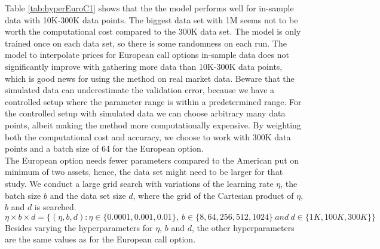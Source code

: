 Table \ref{tab:hyperEuroC1} shows that the the model performs well for in-sample data with 10K-300K data points. The biggest data set with 1M seems not to be worth the computational cost compared to the 300K data set. The model is only trained once on each data set, so there is some randomness on each run. The model to interpolate prices for European call options in-sample data does not significantly improve with gathering more data than 10K-300K data points, which is good news for using the method on real market data.  Beware that the simulated data can underestimate the validation error, because we have a controlled setup where the parameter range is within a predetermined range. For the controlled setup with simulated data we can choose arbitrary many data points, albeit making the method more computationally expensive. By weighting both the computational cost and accuracy, we choose to work with 300K data points and a batch size of 64 for the European option. \\

The European option needs fewer parameters compared to the American put on minimum of two assets, hence, the data set might need to be larger for that study. We conduct a large grid search with variations of the learning rate $\eta$, the batch size $b$ and the data set size $d$, where the grid of the Cartesian product of $\eta$, $b$ and $d$ is searched.
$$\eta \times b \times d = \{(\eta,b, d) : \eta \in \{0.0001, 0.001, 0.01 \}, \ b \in \{8, 64, 256, 512, 1024\} \ and \ d \in\{1K,100K,300K \} \}$$
Besides varying the hyperparameters for $\eta$, $b$ and $d$, the other hyperparameters are the same values as for the European call option.\\

